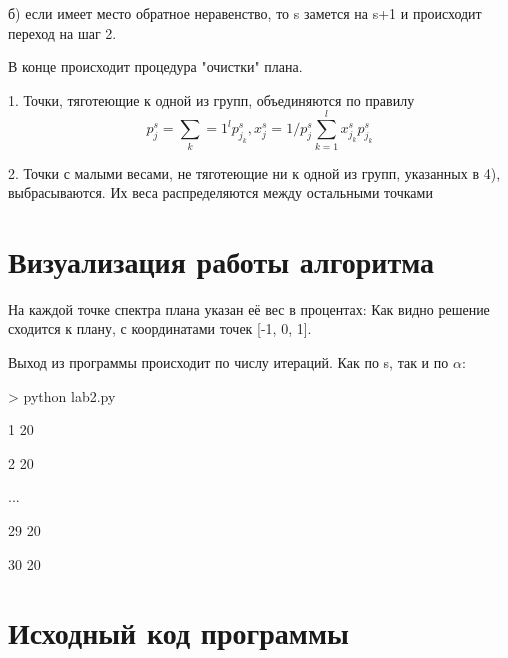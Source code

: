 б) если имеет место обратное неравенство, то s замется на s+1 и происходит переход на шаг 2.
\vspace{5mm}



В конце происходит процедура "очистки" плана.

1. Точки, тяготеющие к одной из групп, объединяются по правилу
\[ p_j^s = \sum_k=1^l p_{j_k}^s, x_j^s = 1 / p_j^s \sum_{k=1}^l {x_{j_k}^s p_{j_k}^s} \]

2. Точки с малыми весами, не тяготеющие ни к одной из групп, указанных в 4), выбрасываются.
Их веса распределяются между остальными точками 





\section{Визуализация работы алгоритма}

На каждой точке спектра плана указан её вес в процентах:
Как видно решение сходится к плану, с координатами точек [-1, 0, 1].



\vspace{10mm}





Выход из программы происходит по числу итераций. Как по s, так и по $\alpha$:

> python lab2.py

1 20

2 20

...

29 20

30 20


\section{Исходный код программы}
